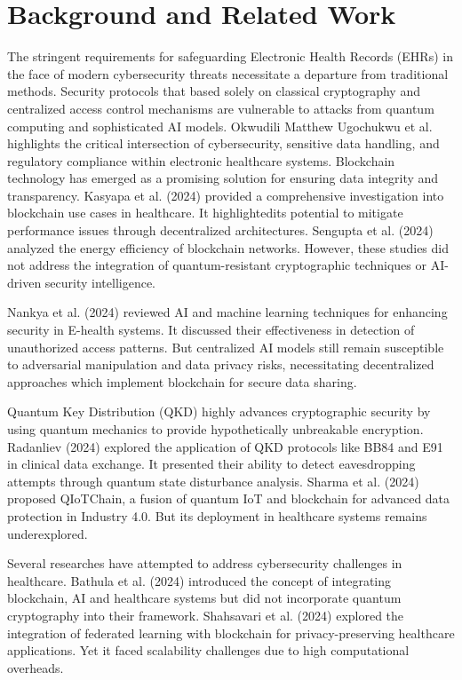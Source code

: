 \documentclass[pdflatex,sn-mathphys-num]{sn-jnl}%
\theoremstyle{thmstyleone}%
\theoremstyle{thmstyletwo}%
\theoremstyle{thmstylethree}%
\begin{document}
\section{Background and Related Work}

The stringent requirements for safeguarding Electronic Health Records (EHRs) in the face of modern cybersecurity threats necessitate a departure from traditional methods. Security protocols that based solely on classical cryptography and centralized access control mechanisms are vulnerable to attacks from quantum computing and sophisticated AI models. Okwudili Matthew Ugochukwu et al. \cite{bib4} highlights the critical intersection of cybersecurity, sensitive data handling, and regulatory compliance within electronic healthcare systems. 
Blockchain technology has emerged as a promising solution for ensuring data integrity and transparency. Kasyapa et al. (2024) \cite{bib8} provided a comprehensive investigation into blockchain use cases in healthcare. It highlightedits potential to mitigate performance issues through decentralized architectures. Sengupta et al. (2024) \cite{bib7} analyzed the energy efficiency of blockchain networks. However, these studies did not address the integration of quantum-resistant cryptographic techniques or AI-driven security intelligence.

Nankya et al. (2024) \cite{bib10} reviewed AI and machine learning techniques for enhancing security in E-health systems. It discussed their effectiveness in detection of unauthorized access patterns. But centralized AI models still remain susceptible to adversarial manipulation and data privacy risks, necessitating decentralized approaches which implement blockchain for secure data sharing.

Quantum Key Distribution (QKD) highly advances cryptographic security by using quantum mechanics to provide hypothetically unbreakable encryption. Radanliev (2024) \cite{bib11} explored the application of QKD protocols like BB84 and E91 in clinical data exchange. It presented their ability to detect eavesdropping attempts through quantum state disturbance analysis. Sharma et al. (2024) \cite{bib16} proposed QIoTChain, a fusion of quantum IoT and blockchain for advanced data protection in Industry 4.0. But its deployment in healthcare systems remains underexplored.

Several researches have attempted to address cybersecurity challenges in healthcare. Bathula et al. (2024) \cite{bib6} introduced the concept of integrating blockchain, AI and healthcare systems but did not incorporate quantum cryptography into their framework. Shahsavari et al. (2024) \cite{bib9} explored the integration of federated learning with blockchain for privacy-preserving healthcare applications. Yet it faced scalability challenges due to high computational overheads.
\end{document}
